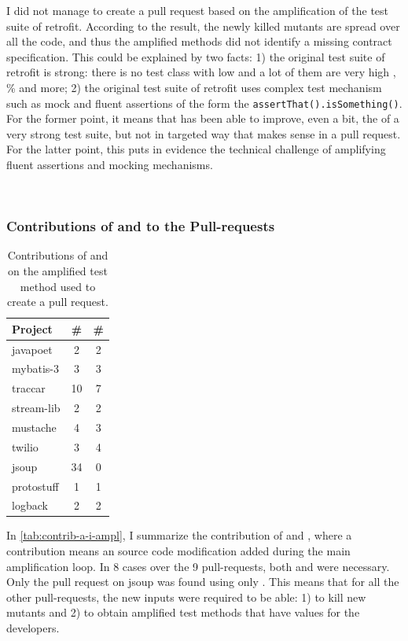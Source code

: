 I did not manage to create a pull request based on the amplification of the test suite of retrofit. 
According to the result, the newly killed mutants are spread over all the code, and thus the amplified methods did not identify a missing contract specification. 
This could be explained by two facts: 
1) the original test suite of retrofit is strong: there is no test class with low \ms and a lot of them are very high \ms, \% and more;
2) the original test suite of retrofit uses complex test mechanism such as mock and fluent assertions of the form the \texttt{assertThat().isSomething()}. 
For the former point, it means that \dspot has been able to improve, even a bit, the \ms of a very strong test suite, but not in targeted way that makes sense in a pull request.
For the latter point, this puts in evidence the technical challenge of amplifying fluent assertions and mocking mechanisms.

~\\

\subsubsection{Contributions of \Aampl and \Iampl to the Pull-requests}

\begin{table}[]
	\caption{Contributions of \Aampl and \Iampl on the amplified test method used to create a pull request.}
	\label{tab:contrib-a-i-ampl}
	\centering\begin{tabular}{lcc}
		\hline
		Project & \#\Aampl &  \#\Iampl \\
		\hline
		javapoet & 2 & 2 \\
		mybatis-3 & 3 & 3 \\
		traccar & 10 & 7 \\
		stream-lib & 2 & 2 \\
		mustache & 4 & 3 \\
		twilio & 3 & 4 \\
		jsoup & 34 & 0 \\
		protostuff & 1 & 1 \\
		logback & 2 & 2 \\
		\hline
	\end{tabular}
\end{table}

In \autoref{tab:contrib-a-i-ampl}, I summarize the contribution of \Aampl and \Iampl, where a contribution means an source code modification added during the main amplification loop. 
In 8 cases over the 9 pull-requests, both \Aampl and \Iampl were necessary. 
Only the pull request on jsoup was found using only \Aampl. 
This means that for all the other pull-requests, the new inputs were required to be able: 
1) to kill new mutants and 
2) to obtain amplified test methods that have values for the developers.

